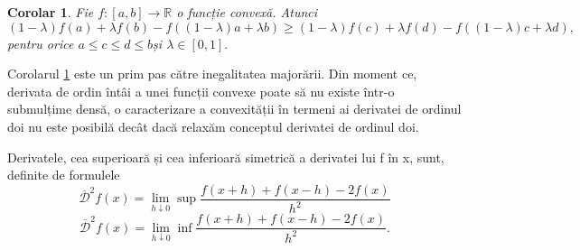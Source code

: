 \documentclass[a4paper,12pt,oneside]{report}
\newtheorem{corollary}{Corolar}
\begin{document}
\begin{corollary} \label{Corolar 3} 
Fie \(f : \left [ a,b \right ] \rightarrow \mathbb{R}\) o funcție convexă. Atunci 
\begin{displaymath}
   \left ( 1-\lambda  \right )f\left ( a \right ) + \lambda f\left ( b \right ) - f\left ( \left ( 1-\lambda  \right )a + \lambda b \right )\geq \left ( 1-\lambda  \right )f\left ( c \right )+\lambda f\left ( d \right ) - f\left ( \left ( 1 -\lambda \right )c + \lambda d \right ), 
\end{displaymath}
pentru orice \(a\leq c\leq d\leq b \)și \(\lambda \in \left [ 0,1 \right ].\) 
\end{corollary}
Corolarul \ref{Corolar 3} este un prim pas către inegalitatea majorării. Din moment ce, derivata de ordin întâi a unei funcții convexe poate să nu existe  într-o submulțime densă, o caracterizare a convexității în termeni ai derivatei de ordinul doi nu este posibilă decât dacă relaxăm conceptul derivatei de ordinul doi. 

Derivatele, cea superioară și cea inferioară simetrică a derivatei lui f în x, sunt, definite de formulele
\begin{displaymath}
   \overline{ \mathcal{D}}^{2}f\left ( x \right ) = \lim_{h\downarrow0} \sup\frac{f\left ( x+h \right ) + f\left ( x-h \right ) -2f\left ( x \right )}{h^{2}}
\end{displaymath}
\begin{displaymath}
   \overline{ \mathcal{D}}^{2}f\left ( x \right ) = \lim_{h\downarrow0} \inf\frac{f\left ( x+h \right ) + f\left ( x-h \right ) -2f\left ( x \right )}{h^{2}}.
\end{displaymath}
\end{document}
